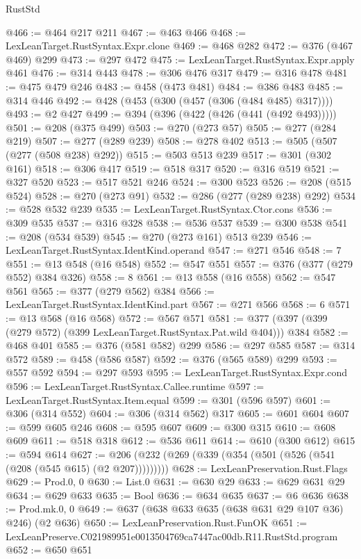 \begin{lexlean}{RustStd}
\begin{coremodule}
@466 := @464 @217 @211
@467 := @463 @466
@468 := LexLeanTarget.RustSyntax.Expr.clone
@469 := @468 @282
@472 := @376 (@467 @469) @299
@473 := @297 @472
@475 := LexLeanTarget.RustSyntax.Expr.apply @461
@476 := @314 @443
@478 := @306 @476 @317
@479 := @316 @478
@481 := @475 @479 @246
@483 := @458 (@473 @481)
@484 := @386 @483
@485 := @314 @446
@492 := @428 (@453 (@300 (@457 (@306 (@484 @485) @317))))
@493 := @2 @427
@499 := @394 (@396 (@422 (@426 (@441 (@492 @493)))))
@501 := @208 (@375 @499)
@503 := @270 (@273 @57)
@505 := @277 (@284 @219)
@507 := @277 (@289 @239)
@508 := @278 @402
@513 := @505 (@507 (@277 (@508 @238) @292))
@515 := @503 @513 @239
@517 := @301 (@302 @161)
@518 := @306 @417
@519 := @518 @317
@520 := @316 @519
@521 := @327 @520
@523 := @517 @521 @246
@524 := @300 @523
@526 := @208 (@515 @524)
@528 := @270 (@273 @91)
@532 := @286 (@277 (@289 @238) @292)
@534 := @528 @532 @239
@535 := LexLeanTarget.RustSyntax.Ctor.cons
@536 := @309 @535
@537 := @316 @328
@538 := @536 @537
@539 := @300 @538
@541 := @208 (@534 @539)
@545 := @270 (@273 @161) @513 @239
@546 := LexLeanTarget.RustSyntax.IdentKind.operand
@547 := @271 @546
@548 := 7
@551 := @13 @548 (@16 @548)
@552 := @547 @551
@557 := @376 (@377 (@279 @552) @384 @326)
@558 := 8
@561 := @13 @558 (@16 @558)
@562 := @547 @561
@565 := @377 (@279 @562) @384
@566 := LexLeanTarget.RustSyntax.IdentKind.part
@567 := @271 @566
@568 := 6
@571 := @13 @568 (@16 @568)
@572 := @567 @571
@581 := @377 (@397 (@399 (@279 @572) (@399 LexLeanTarget.RustSyntax.Pat.wild @404))) @384
@582 := @468 @401
@585 := @376 (@581 @582) @299
@586 := @297 @585
@587 := @314 @572
@589 := @458 (@586 @587)
@592 := @376 (@565 @589) @299
@593 := @557 @592
@594 := @297 @593
@595 := LexLeanTarget.RustSyntax.Expr.cond
@596 := LexLeanTarget.RustSyntax.Callee.runtime
@597 := LexLeanTarget.RustSyntax.Item.equal
@599 := @301 (@596 @597)
@601 := @306 (@314 @552)
@604 := @306 (@314 @562) @317
@605 := @601 @604
@607 := @599 @605 @246
@608 := @595 @607
@609 := @300 @315
@610 := @608 @609
@611 := @518 @318
@612 := @536 @611
@614 := @610 (@300 @612)
@615 := @594 @614
@627 := @206 (@232 (@269 (@339 (@354 (@501 (@526 (@541 (@208 (@545 @615) (@2 @207)))))))))
@628 := LexLeanPreservation.Rust.Flags
@629 := Prod.{0, 0}
@630 := List.{0}
@631 := @630 @29
@633 := @629 @631 @29
@634 := @629 @633
@635 := Bool
@636 := @634 @635
@637 := @6 @636
@638 := Prod.mk.{0, 0}
@649 := @637 (@638 @633 @635 (@638 @631 @29 @107 @36) @246) (@2 @636)
@650 := LexLeanPreservation.Rust.FunOK
@651 := LexLeanPreserve.C021989951e0013504769ca7447ac00db.R11.RustStd.program
@652 := @650 @651

\end{coremodule}
\end{lexlean}
